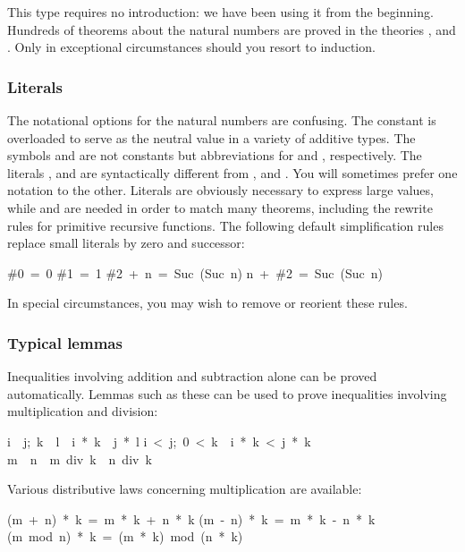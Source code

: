 %
This type requires no introduction: we have been using it from the
beginning.  Hundreds of theorems about the natural numbers are
proved in the theories ,  and .  Only
in exceptional circumstances should you resort to induction.

\subsubsection{Literals}
%
The notational options for the natural numbers are confusing.  The 
constant  is overloaded to serve as the neutral value 
in a variety of additive types. The symbols  and  are 
not constants but abbreviations for  and ,
respectively. The literals ,  and   are
syntactically different from ,  and . You  will
sometimes prefer one notation to the other. Literals are  obviously
necessary to express large values, while  and   are needed
in order to match many theorems, including the rewrite  rules for primitive
recursive functions. The following default  simplification rules replace
small literals by zero and successor: 
\begin{isabelle}
\#0\ =\ 0
\isanewline
\#1\ =\ 1
\isanewline
\#2\ +\ n\ =\ Suc\ (Suc\ n)
\isanewline
n\ +\ \#2\ =\ Suc\ (Suc\ n)
\end{isabelle}
In special circumstances, you may wish to remove or reorient 
these rules. 

\subsubsection{Typical lemmas}
Inequalities involving addition and subtraction alone can be proved
automatically.  Lemmas such as these can be used to prove inequalities
involving multiplication and division:
\begin{isabelle}
\isasymlbrakk i\ \isasymle \ j;\ k\ \isasymle \ l\isasymrbrakk \ \isasymLongrightarrow \ i\ *\ k\ \isasymle \ j\ *\ l%
\isanewline
\isasymlbrakk i\ <\ j;\ 0\ <\ k\isasymrbrakk \ \isasymLongrightarrow \ i\
*\ k\ <\ j\ *\ k%
\isanewline
m\ \isasymle \ n\ \isasymLongrightarrow \ m\ div\ k\ \isasymle \ n\ div\ k%
\rulename{div_le_mono}
\end{isabelle}
%
Various distributive laws concerning multiplication are available:
\begin{isabelle}
(m\ +\ n)\ *\ k\ =\ m\ *\ k\ +\ n\ *\ k%
\isanewline
(m\ -\ n)\ *\ k\ =\ m\ *\ k\ -\ n\ *\ k%
\isanewline
(m\ mod\ n)\ *\ k\ =\ (m\ *\ k)\ mod\ (n\ *\ k)
\end{isabelle}

